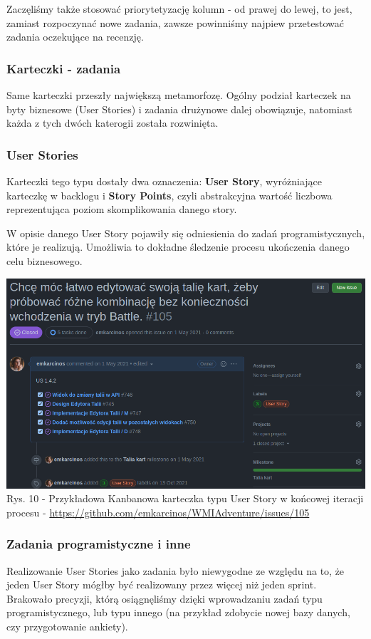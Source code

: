 \documentclass{article}
\begin{document}
Zaczęliśmy także stosować priorytetyzację kolumn - od prawej do lewej, to jest, zamiast rozpoczynać nowe zadania, zawsze powinniśmy najpiew przetestować zadania oczekujące na recenzję.

\subsubsection*{Karteczki - zadania}
Same karteczki przeszły największą metamorfozę. Ogólny podział karteczek na byty biznesowe (User Stories) i zadania drużynowe dalej obowiązuje, natomiast każda z tych dwóch katerogii została rozwinięta.

\subsubsection*{User Stories}
Karteczki tego typu dostały dwa oznaczenia: \textbf{User Story}, wyróżniające karteczkę w backlogu i \textbf{Story Points}, czyli abstrakcyjna wartość liczbowa reprezentująca poziom skomplikowania danego story.

W opisie danego User Story pojawiły się odniesienia do zadań programistycznych, które je realizują. Umożliwia to dokładne śledzenie procesu ukończenia danego celu biznesowego.

\begin{center}
    \includegraphics[scale=0.5]{card_user_story_example.png}
    \newline
    Rys. 10 - Przykładowa Kanbanowa karteczka typu User Story w końcowej iteracji procesu - \url{https://github.com/emkarcinos/WMIAdventure/issues/105}
\end{center}

\subsubsection*{Zadania programistyczne i inne}
Realizowanie User Stories jako zadania było niewygodne ze względu na to, że jeden User Story mógłby być realizowany przez więcej niż jeden sprint. Brakowało precyzji, którą osiągnęliśmy dzięki wprowadzaniu zadań typu programistycznego, lub typu innego (na przykład zdobycie nowej bazy danych, czy przygotowanie ankiety).
\end{document}

